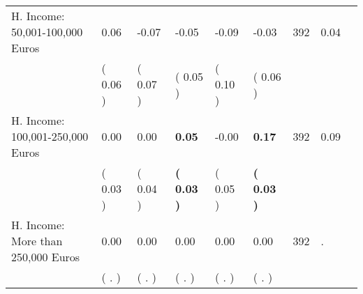 \begin{tabular}{L{6.2cm} C{1.8cm} C{1.8cm} C{1.8cm} C{1.8cm} C{1.8cm} C{1.8cm} C{0.3cm} C{0.3cm}}
H. Income: 50,001-100,000 Euros &      0.06 &     -0.07 &     -0.05 &     -0.09 &     -0.03  & 392 &       0.04 \\ 
 & (     0.06 ) & (     0.07 ) & (     0.05 ) & (     0.10 ) & (     0.06 )  & \\
H. Income: 100,001-250,000 Euros &      0.00 &      0.00 & \textbf{     0.05} &     -0.00 & \textbf{     0.17}  & 392 &       0.09 \\ 
 & (     0.03 ) & (     0.04 ) & \textbf{(     0.03 )} & (     0.05 ) & \textbf{(     0.03 )}  & \\
H. Income: More than 250,000 Euros &      0.00 &      0.00 &      0.00 &      0.00 &      0.00  & 392 &          . \\ 
 & (        . ) & (        . ) & (        . ) & (        . ) & (        . )  & \\
\bottomrule
\end{tabular}
